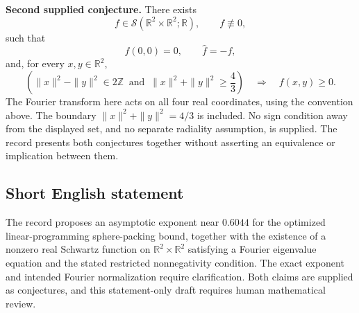 \documentclass[11pt]{article}
\newcommand{\Z}{\mathbb{Z}}
\newcommand{\R}{\mathbb{R}}
\begin{document}
\textbf{Second supplied conjecture.} There exists
\[
f\in\mathcal S(\R^2\times\R^2;\R),\qquad f\not\equiv0,
\]
such that
\[
f(0,0)=0,\qquad \widehat f=-f,
\]
and, for every \(x,y\in\R^2\),
\[
\left(\|x\|^2-\|y\|^2\in2\Z\ \text{ and }\
\|x\|^2+\|y\|^2\geq\frac43\right)
\quad\Longrightarrow\quad f(x,y)\geq0.
\]
The Fourier transform here acts on all four real coordinates, using the convention above. The boundary \(\|x\|^2+\|y\|^2=4/3\) is included. No sign condition away from the displayed set, and no separate radiality assumption, is supplied. The record presents both conjectures together without asserting an equivalence or implication between them.
\subsection{Short English statement}
The record proposes an asymptotic exponent near \(0.6044\) for the optimized linear-programming sphere-packing bound, together with the existence of a nonzero real Schwartz function on \(\R^2\times\R^2\) satisfying a Fourier eigenvalue equation and the stated restricted nonnegativity condition. The exact exponent and intended Fourier normalization require clarification. Both claims are supplied as conjectures, and this statement-only draft requires human mathematical review.
\end{document}
